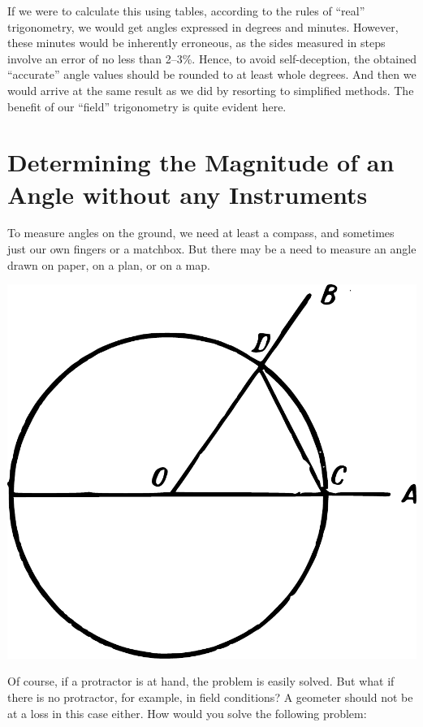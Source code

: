 If we were to calculate this using tables, according to the rules of ``real'' trigonometry, we would get angles expressed in degrees and minutes. However, these minutes would be inherently erroneous, as the sides measured in steps involve an error of no less than 2–3\%. Hence, to avoid self-deception, the obtained ``accurate'' angle values should be rounded to at least whole degrees. And then we would arrive at the same result as we did by resorting to simplified methods. The benefit of our ``field'' trigonometry is quite evident here.


\section{Determining the Magnitude of an Angle without any Instruments}

To measure angles on the ground, we need at least a compass, and sometimes just our own fingers or a matchbox. But there may be a need to measure an angle drawn on paper, on a plan, or on a map.

\begin{marginfigure}%
\centering
\includegraphics[width=\textwidth]{figures/ch-05/fig-097.pdf}
\end{marginfigure}

Of course, if a protractor is at hand, the problem is easily solved. But what if there is no protractor, for example, in field conditions? A geometer should not be at a loss in this case either. How would you solve the following problem: 

